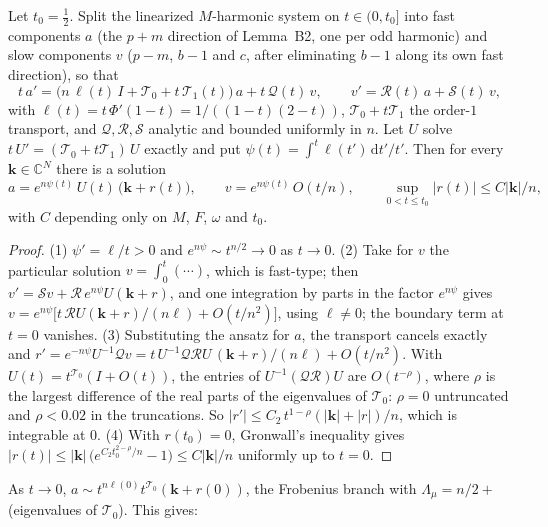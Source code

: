 \documentclass{amsart}
\numberwithin{equation}{section}
\theoremstyle{plain}
\newenvironment{lemnamed}[1]{\renewcommand\theinnerlem{#1}\innerlem}{\endinnerlem}
\theoremstyle{definition}
\theoremstyle{remark}
\newcommand{\dd}{\mathrm{d}}
\begin{document}
\begin{lemnamed}{B6$'$ (Volterra bound)}\label{lem:B6p}
Let $t_0 = \tfrac12$. Split the linearized $M$-harmonic system on $t \in (0, t_0]$ into fast components $a$ (the $p + m$
direction of Lemma~B2, one per odd harmonic) and slow components $v$ ($p - m$, $b - 1$ and $c$, after eliminating $b - 1$
along its own fast direction), so that
\[
t\,a' = \big(n\,\ell(t)\,I + \mathcal T_0 + t\,\mathcal T_1(t)\big)\,a + t\,\mathcal Q(t)\,v, \qquad v' = \mathcal R(t)\,a + \mathcal S(t)\,v ,
\]
with $\ell(t) = t\,\Phi'(1-t) = 1/((1-t)(2-t))$, $\mathcal T_0 + t\mathcal T_1$ the order-$1$ transport, and $\mathcal Q, \mathcal R, \mathcal S$
analytic and bounded uniformly in $n$. Let $U$ solve $t\,U' = (\mathcal T_0 + t\mathcal T_1)\,U$ exactly and put
$\psi(t) = \int^t \ell(t')\,\dd t'/t'$. Then for every $\mathbf k \in \mathbb C^N$ there is a solution
\[
a = e^{n\psi(t)}\,U(t)\,\big(\mathbf k + r(t)\big), \qquad v = e^{n\psi(t)}\,O(t/n), \qquad \sup_{0 < t \le t_0}|r(t)| \le C|\mathbf k|/n ,
\]
with $C$ depending only on $M$, $F$, $\omega$ and $t_0$.
\end{lemnamed}

\begin{proof}
(1) $\psi' = \ell/t > 0$ and $e^{n\psi} \sim t^{n/2} \to 0$ as $t \to 0$. (2) Take for $v$ the particular solution
$v = \int_0^t(\cdots)$, which is fast-type; then $v' = \mathcal Sv + \mathcal R\,e^{n\psi}U(\mathbf k+r)$, and one integration by parts in the
factor $e^{n\psi}$ gives $v = e^{n\psi}\big[t\,\mathcal RU(\mathbf k+r)/(n\ell) + O(t/n^2)\big]$, using $\ell \ne 0$; the boundary term at
$t = 0$ vanishes. (3) Substituting the ansatz for $a$, the transport cancels exactly and
$r' = e^{-n\psi}U^{-1}\mathcal Qv = t\,U^{-1}\mathcal Q\mathcal R U\,(\mathbf k+r)/(n\ell) + O(t/n^2)$. With $U(t) = t^{\mathcal T_0}(I + O(t))$, the
entries of $U^{-1}(\mathcal Q\mathcal R)U$ are $O(t^{-\rho})$, where $\rho$ is the largest difference of the real parts of the
eigenvalues of $\mathcal T_0$: $\rho = 0$ untruncated and $\rho < 0.02$ in the truncations. So
$|r'| \le C_2\,t^{1-\rho}(|\mathbf k| + |r|)/n$, which is integrable at $0$. (4) With $r(t_0) = 0$, Gronwall's inequality gives
$|r(t)| \le |\mathbf k|\,\big(e^{C_2 t_0^{2-\rho}/n} - 1\big) \le C|\mathbf k|/n$ uniformly up to $t = 0$.
\end{proof}

As $t \to 0$, $a \sim t^{n\ell(0)}t^{\mathcal T_0}(\mathbf k + r(0))$, the Frobenius branch with $\Lambda_\mu = n/2 + $ (eigenvalues of
$\mathcal T_0$). This gives:
\end{document}
